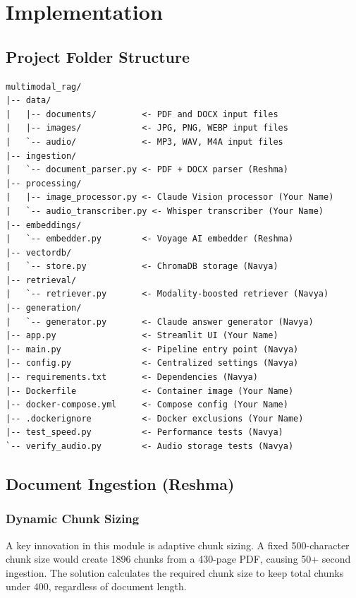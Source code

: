 \documentclass[12pt,a4paper]{report}
\begin{document}
\chapter{Implementation}

\section{Project Folder Structure}

\begin{lstlisting}[caption=Complete Project Structure]
multimodal_rag/
|-- data/
|   |-- documents/         <- PDF and DOCX input files
|   |-- images/            <- JPG, PNG, WEBP input files
|   `-- audio/             <- MP3, WAV, M4A input files
|-- ingestion/
|   `-- document_parser.py <- PDF + DOCX parser (Reshma)
|-- processing/
|   |-- image_processor.py <- Claude Vision processor (Your Name)
|   `-- audio_transcriber.py <- Whisper transcriber (Your Name)
|-- embeddings/
|   `-- embedder.py        <- Voyage AI embedder (Reshma)
|-- vectordb/
|   `-- store.py           <- ChromaDB storage (Navya)
|-- retrieval/
|   `-- retriever.py       <- Modality-boosted retriever (Navya)
|-- generation/
|   `-- generator.py       <- Claude answer generator (Navya)
|-- app.py                 <- Streamlit UI (Your Name)
|-- main.py                <- Pipeline entry point (Navya)
|-- config.py              <- Centralized settings (Navya)
|-- requirements.txt       <- Dependencies (Navya)
|-- Dockerfile             <- Container image (Your Name)
|-- docker-compose.yml     <- Compose config (Your Name)
|-- .dockerignore          <- Docker exclusions (Your Name)
|-- test_speed.py          <- Performance tests (Navya)
`-- verify_audio.py        <- Audio storage tests (Navya)
\end{lstlisting}

\section{Document Ingestion (Reshma)}

\subsection{Dynamic Chunk Sizing}

A key innovation in this module is adaptive chunk sizing. A fixed 500-character chunk size would create 1896 chunks from a 430-page PDF, causing 50+ second ingestion. The solution calculates the required chunk size to keep total chunks under 400, regardless of document length.
\end{document}
